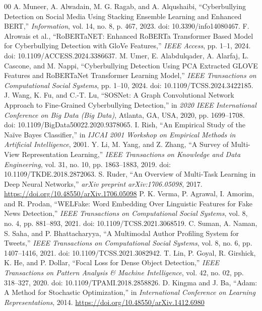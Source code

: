 \documentclass[journal]{IEEEtran}
\begin{document}
\begin{thebibliography}{00}
 A. Muneer, A. Alwadain, M. G. Ragab, and A. Alqushaibi, ``Cyberbullying Detection on Social Media Using Stacking Ensemble Learning and Enhanced BERT,'' \textit{Information}, vol. 14, no. 8, p. 467, 2023. doi: 10.3390/info14080467.
 F. Alrowais et al., ``RoBERTaNET: Enhanced RoBERTa Transformer Based Model for Cyberbullying Detection with GloVe Features,'' \textit{IEEE Access}, pp. 1--1, 2024. doi: 10.1109/ACCESS.2024.3386637.
 M. Umer, E. Alabdulqader, A. Alarfaj, L. Cascone, and M. Nappi, ``Cyberbullying Detection Using PCA Extracted GLOVE Features and RoBERTaNet Transformer Learning Model,'' \textit{IEEE Transactions on Computational Social Systems}, pp. 1--10, 2024. doi: 10.1109/TCSS.2024.3422185.
 J. Wang, K. Fu, and C.-T. Lu, ``SOSNet: A Graph Convolutional Network Approach to Fine-Grained Cyberbullying Detection,'' in \textit{2020 IEEE International Conference on Big Data (Big Data)}, Atlanta, GA, USA, 2020, pp. 1699--1708. doi: 10.1109/BigData50022.2020.9378065.
 I. Rish, ``An Empirical Study of the Na\"{i}ve Bayes Classifier,'' in \textit{IJCAI 2001 Workshop on Empirical Methods in Artificial Intelligence}, 2001.
 Y. Li, M. Yang, and Z. Zhang, ``A Survey of Multi-View Representation Learning,'' \textit{IEEE Transactions on Knowledge and Data Engineering}, vol. 31, no. 10, pp. 1863--1883, 2019. doi: 10.1109/TKDE.2018.2872063.
 S. Ruder, ``An Overview of Multi-Task Learning in Deep Neural Networks,'' \textit{arXiv preprint arXiv:1706.05098}, 2017. \url{https://doi.org/10.48550/arXiv.1706.05098}
 P. K. Verma, P. Agrawal, I. Amorim, and R. Prodan, ``WELFake: Word Embedding Over Linguistic Features for Fake News Detection,'' \textit{IEEE Transactions on Computational Social Systems}, vol. 8, no. 4, pp. 881--893, 2021. doi: 10.1109/TCSS.2021.3068519.
 C. Suman, A. Naman, S. Saha, and P. Bhattacharyya, ``A Multimodal Author Profiling System for Tweets,'' \textit{IEEE Transactions on Computational Social Systems}, vol. 8, no. 6, pp. 1407--1416, 2021. doi: 10.1109/TCSS.2021.3082942.
 T. Lin, P. Goyal, R. Girshick, K. He, and P. Dollar, ``Focal Loss for Dense Object Detection,'' \textit{IEEE Transactions on Pattern Analysis \& Machine Intelligence}, vol. 42, no. 02, pp. 318--327, 2020. doi: 10.1109/TPAMI.2018.2858826.
 D. Kingma and J. Ba, ``Adam: A Method for Stochastic Optimization,'' in \textit{International Conference on Learning Representations}, 2014. \url{https://doi.org/10.48550/arXiv.1412.6980}

\end{thebibliography}
\end{document}
